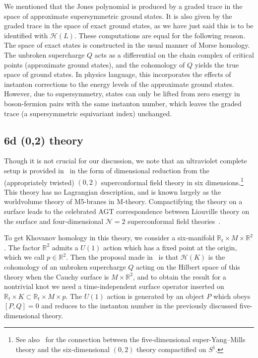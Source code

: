 \documentclass[11pt]{article}
\numberwithin{equation}{section}
\begin{document}
We mentioned that the Jones polynomial is produced by a graded trace in the space of approximate supersymmetric ground states.
It is also given by the graded trace in the space of exact ground states, as we have just said this is to be identified with $\mathcal{H}(L)$.
These computations are equal for the following reason.
The space of exact states is constructed in the usual manner of Morse homology.
The unbroken supercharge $Q$ acts as a differential on the chain complex of critical points (approximate ground states), and the cohomology of $Q$ yields the true space of ground states.
In physics language, this incorporates the effects of instanton corrections to the energy levels of the approximate ground states.
However, due to supersymmetry, states can only be lifted from zero energy in boson-fermion pairs with the same instanton number, which leaves the graded trace (a supersymmetric equivariant index) unchanged.

\subsection{6d (0,2) theory}
Though it is not crucial for our discussion, we note that an ultraviolet complete setup is provided in~\cite{Witten:2011zz} in the form of dimensional reduction from the (appropriately twisted) $(0,2)$ superconformal field theory in six dimensions.\footnote{
See also~\cite{Douglas:2010iu,Lambert:2010iw} for the connection between the five-dimensional super-Yang--Mills theory and the six-dimensional $(0,2)$ theory compactified on $S^1$.}
This theory has no Lagrangian description, and is known largely as the worldvolume theory of M5-branes in M-theory.
Compactifying the theory on a surface leads to the celebrated AGT correspondence between Liouville theory on the surface and four-dimensional $\mathcal{N}=2$ superconformal field theories~\cite{Alday:2009aq}.

To get Khovanov homology in this theory, we consider a six-manifold $\mathbb{R}_t \times M \times \mathbb{R}^2$.
The factor $\mathbb{R}^2$ admits a $U(1)$ action which has a fixed point at the origin, which we call $p \in \mathbb{R}^2$.
Then the proposal made in~\cite{Witten:2011zz} is that $\mathcal{H}(K)$ is the cohomology of an unbroken supercharge $Q$ acting on the Hilbert space of this theory when the Cauchy surface is $M \times \mathbb{R}^2$, and to obtain the result for a nontrivial knot we need a time-independent surface operator inserted on $\mathbb{R}_t \times K \subset \mathbb{R}_t \times M \times p$.
The $U(1)$ action is generated by an object $P$ which obeys $[P,Q]=0$ and reduces to the instanton number in the previously discussed five-dimensional theory.
\end{document}

